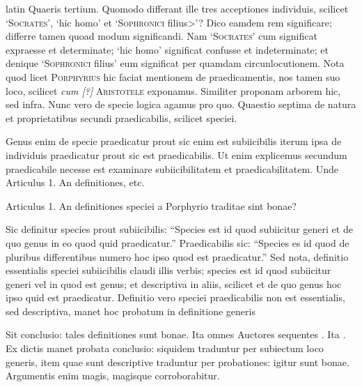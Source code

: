\begin{otherlanguage*}{latin}
\pstart
Quaeris tertium. Quomodo differant ille tres acceptiones individuis, scilicet `\textsc{Socrates}', `hic homo' et `\textsc{Sophronici} filius>'? Dico eamdem rem significare; differre tamen quoad modum significandi. Nam `\textsc{Socrates}' cum significat expraesse et determinate; `hic homo' significat confusse et indeterminate; et denique `\textsc{Sophronici} filius' eum significat per quamdam circunlocutionem. Nota quod licet \textsc{Porphyrius} hic faciat mentionem de praedicamentis, nos tamen suo loco, scilicet \emph{cum [?]} \textsc{Aristotele} exponamus. Similiter proponam arborem hic, sed infra. Nunc vero de specie logica agamus pro quo. Quaestio septima de natura et proprietatibus secundi praedicabilis, scilicet speciei. 
\pend

        \pstart
        \pend
      
\pstart
 Genus enim de specie praedicatur prout sic enim est subiicibilis iterum ipsa de individuis praedicatur prout sic est praedicabilis. Ut enim explicemus secundum praedicabile necesse est examinare subiicibilitatem et praedicabilitatem. Unde Articulus 1. An definitiones, etc. 
\pend

        \pstart
        \pend
      
\pstart
\noindent%
 Articulus 1. An definitiones speciei a Porphyrio traditae sint bonae? 
\pend

\pstart
 Sic definitur species prout subiicibilis: \enquote{Species est id quod subiicitur generi et de quo genus in eo quod quid praedicatur.} Praedicabilis sic: \enquote{Species es id quod de pluribus differentibus numero hoc ipso quod est praedicatur.} Sed nota, definitio essentialis speciei subiicibilis claudi illis verbis; species est id quod subiicitur generi vel in quod est genus; et descriptiva in aliis, scilicet et de quo genus hoc ipso quid est praedicatur. Definitio vero speciei praedicabilis non est essentialis, sed descriptiva, manet hoc probatum in definitione generis 
\pend

\pstart
 Sit conclusio: tales definitiones sunt bonae. Ita omnes Auctores sequentes . Ita . Ex dictis manet probata conclusio: siquidem traduntur per subiectum loco generis, item quae sunt descriptive traduntur per probationes: igitur sunt bonae. Argumentis enim magis, magisque corroborabitur. 
\pend


\end{otherlanguage*}
